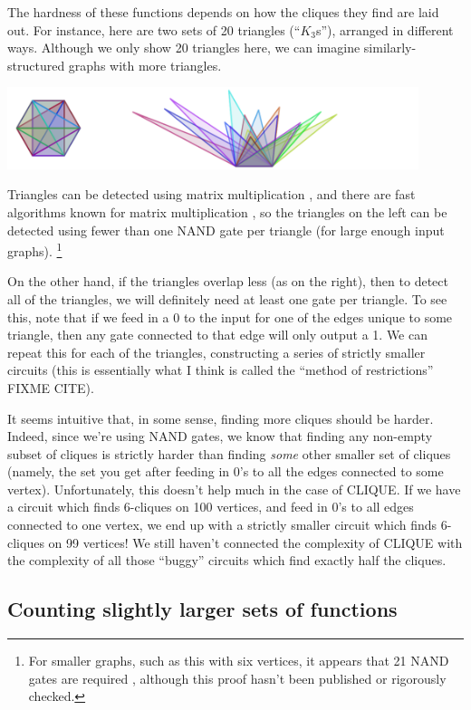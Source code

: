 \documentclass[12pt]{article}
\theoremstyle{definition}
\begin{document}
The hardness of these functions depends
on how the cliques they find are laid out.
For instance, here are two sets of 20 triangles (``$K_3$s''),
arranged in different ways. Although we only show 20 triangles here,
we can imagine similarly-structured graphs with more triangles.

\includegraphics[width=0.9\textwidth]{R/tri1.pdf}

Triangles can be detected using matrix multiplication \cite{itai_finding_1977},
and there are fast algorithms known for matrix multiplication
\cite{strassen_gaussian_1969}
\cite{williams_multiplying_2012}, so
the triangles on the left can be detected
using fewer than one NAND gate per triangle (for large enough input graphs).
\footnote{For smaller graphs, such as this with six vertices,
it appears that 21 NAND gates are required
\cite{burdick_triangles_6_vertex},
although this proof hasn't been published or rigorously checked.}

On the other hand, if the triangles overlap less (as on the right),
then to detect all of the triangles, we will definitely need at least one
gate per triangle.
To see this, note that if we feed in a 0 to the input for one
of the edges unique to some triangle, then any gate connected to
that edge will only output a 1. We can repeat this for each of the
triangles, constructing a series of strictly smaller circuits
(this is essentially what I think is called
the ``method of restrictions'' FIXME CITE).

It seems intuitive that, in some sense, finding more cliques should
be harder.
Indeed, since we're using NAND gates, we know that finding any non-empty
subset of cliques is strictly harder than finding {\em some} other 
smaller set of cliques (namely, the set you get after feeding in 0's to
all the edges connected to some vertex).
Unfortunately, this doesn't help much
in the case of CLIQUE.  If we have a circuit which
finds 6-cliques on 100 vertices, and feed in 0's to all edges connected to
one vertex, we
end up with a strictly smaller circuit which finds 6-cliques on
99 vertices! We still haven't connected the complexity of CLIQUE with
the complexity of all those ``buggy'' circuits which find exactly half
the cliques.

\subsection{Counting slightly larger sets of functions}
\end{document}
